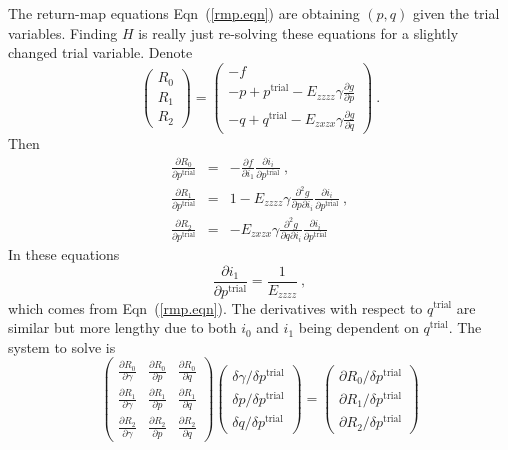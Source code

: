 \documentclass[]{scrreprt}
\begin{document}
The return-map equations Eqn~(\ref{rmp.eqn}) are obtaining $(p, q)$
given the trial variables.  Finding $H$ is really just re-solving
these equations for a slightly changed trial variable.  Denote
\begin{equation}
\left( \begin{array}{l} R_{0} \\ R_{1} \\ R_{2} \end{array} \right)
=
\left( \begin{array}{l} -f \\ -p + p^{\mathrm{trial}} - E_{zzzz}\gamma \frac{\partial g}{\partial
  p} \\ -q + q^{\mathrm{trial}} - E_{zxzx}\gamma \frac{\partial g}{\partial
  q} \end{array} \right) \ .
\end{equation}
Then
\begin{eqnarray}
\frac{\partial R_{0}}{\partial p^{\mathrm{trial}}} & = & -\frac{\partial
  f}{\partial i_{1}} \frac{\partial i_{i}}{\partial
  p^{\mathrm{trial}}}  \ , \\
\frac{\partial R_{1}}{\partial p^{\mathrm{trial}}} & = & 1 -
E_{zzzz}\gamma \frac{\partial^{2}g}{\partial p\partial i_{i}}\frac{\partial i_{i}}{\partial
  p^{\mathrm{trial}}}
\ , \\
\frac{\partial R_{2}}{\partial p^{\mathrm{trial}}} & = &
-E_{zxzx}\gamma \frac{\partial^{2}g}{\partial q\partial i_{i}}\frac{\partial i_{i}}{\partial
  p^{\mathrm{trial}}}
\end{eqnarray}
In these equations
\begin{equation}
\frac{\partial i_{1}}{\partial p^{\mathrm{trial}}} =
\frac{1}{E_{zzzz}} \ ,
\end{equation}
which comes from Eqn~(\ref{rmp.eqn}).  The derivatives with respect to
$q^{\mathrm{trial}}$ are similar but more lengthy due to both $i_{0}$
and $i_{1}$ being dependent on $q^{\mathrm{trial}}$.  The system to
solve is
\begin{equation}
\left( \begin{array}{ccc}
\frac{\partial R_{0}}{\partial \gamma} & \frac{\partial R_{0}}{\partial p} & \frac{\partial R_{0}}{\partial q} \\
\frac{\partial R_{1}}{\partial \gamma} & \frac{\partial R_{1}}{\partial p} & \frac{\partial R_{1}}{\partial q} \\
\frac{\partial R_{2}}{\partial \gamma} & \frac{\partial
  R_{2}}{\partial p} & \frac{\partial R_{2}}{\partial q}
\end{array} \right)
\left( \begin{array}{c}
\delta \gamma/\delta p^{\mathrm{trial}} \\
\delta p/\delta p^{\mathrm{trial}} \\
\delta q/\delta p^{\mathrm{trial}}
\end{array} \right) =
\left( \begin{array}{c}
\partial R_{0}/\delta p^{\mathrm{trial}} \\
\partial R_{1}/\delta p^{\mathrm{trial}} \\
\partial R_{2}/\delta p^{\mathrm{trial}}
\end{array} \right)
\end{equation}
\end{document}
